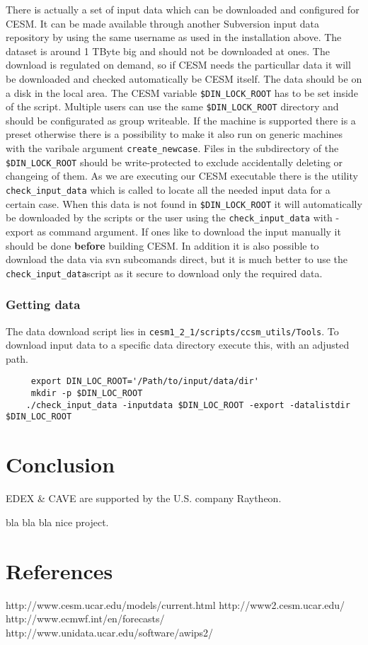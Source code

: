 \documentclass[]{article}
\begin{document}
There is actually a set of input data which can be downloaded and
configured for CESM. It can be made available through another Subversion
input data repository by using the same username as used in the
installation above. The dataset is around 1 TByte big and should not be
downloaded at ones. The download is regulated on demand, so if CESM
needs the particullar data it will be downloaded and checked
automatically be CESM itself. The data should be on a disk in the local
area. The CESM variable \texttt{\$DIN\_LOCK\_ROOT} has to be set inside
of the script. Multiple users can use the same
\texttt{\$DIN\_LOCK\_ROOT} directory and should be configurated as group
writeable. If the machine is supported there is a preset otherwise there
is a possibility to make it also run on generic machines with the
varibale argument \texttt{create\_newcase}. Files in the subdirectory of
the \texttt{\$DIN\_LOCK\_ROOT} should be write-protected to exclude
accidentally deleting or changeing of them. As we are executing our CESM
executable there is the utility \texttt{check\_input\_data} which is
called to locate all the needed input data for a certain case. When this
data is not found in \texttt{\$DIN\_LOCK\_ROOT} it will automatically be
downloaded by the scripts or the user using the
\texttt{check\_input\_data} with -export as command argument. If ones
like to download the input manually it should be done \textbf{before}
building CESM. In addition it is also possible to download the data via
svn subcomands direct, but it is much better to use the
\texttt{check\_input\_data}script as it secure to download only the
required data.

\subsubsection{Getting data}\label{getting-data}

The data download script lies in
\texttt{cesm1\_2\_1/scripts/ccsm\_utils/Tools}. To download input data
to a specific data directory execute this, with an adjusted path.

\begin{verbatim}
     export DIN_LOC_ROOT='/Path/to/input/data/dir'
     mkdir -p $DIN_LOC_ROOT
    ./check_input_data -inputdata $DIN_LOC_ROOT -export -datalistdir $DIN_LOC_ROOT       
\end{verbatim}

\section{Conclusion}\label{conclusion}

EDEX \& CAVE are supported by the U.S. company Raytheon.

bla bla bla nice project.

\section{References}\label{references}

http://www.cesm.ucar.edu/models/current.html http://www2.cesm.ucar.edu/
http://www.ecmwf.int/en/forecasts/
http://www.unidata.ucar.edu/software/awips2/
\end{document}
